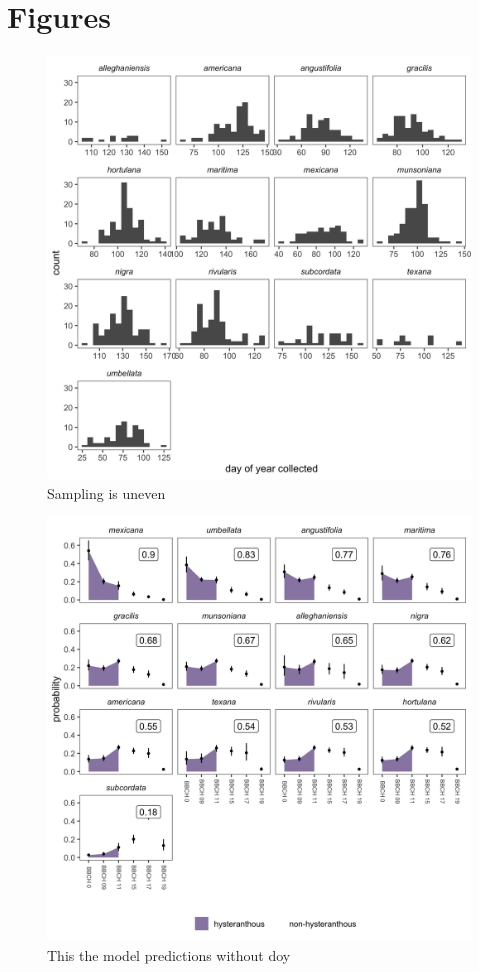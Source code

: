 \documentclass{article}[11pt]
\begin{document}
\section*{Figures} 
\begin{figure}[h!]
    \centering
 \includegraphics[width=.95\textwidth]{..//..//Plots/whatReviwerswant/seasonal_distrbn.jpeg}
    \caption{Sampling is uneven}
    \label{fig:samps}
\end{figure}


\begin{figure}[h!]
    \centering
 \includegraphics[width=.95\textwidth]{..//..//Plots/whatReviwerswant/sps_preds_nodoy4supp.jpeg}
    \caption{This the model predictions without doy}
    \label{fig:nodoy}
\end{figure}
\end{document}
